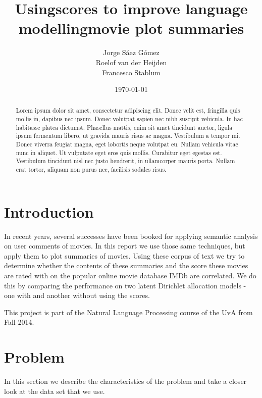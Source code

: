 \documentclass[a4paper,10pt]{article}
\title{Usingscores to improve language modellingmovie plot summaries}
\author{Jorge S\'{a}ez G\'{o}mez\\
Roelof van der Heijden\\
Francesco Stablum
}
\date{\today}
\begin{document}
\maketitle
\begin{abstract}
  Lorem ipsum dolor sit amet, consectetur adipiscing elit. Donec velit est, fringilla quis mollis in, dapibus nec ipsum. Donec volutpat sapien nec nibh suscipit vehicula. In hac habitasse platea dictumst. Phasellus mattis, enim sit amet tincidunt auctor, ligula ipsum fermentum libero, ut gravida mauris risus ac magna. Vestibulum a tempor mi. Donec viverra feugiat magna, eget lobortis neque volutpat eu. Nullam vehicula vitae nunc in aliquet. Ut vulputate eget eros quis mollis. Curabitur eget egestas est. Vestibulum tincidunt nisl nec justo hendrerit, in ullamcorper mauris porta. Nullam erat tortor, aliquam non purus nec, facilisis sodales risus.
\end{abstract}

\section{Introduction} 
In recent years, several successes have been booked for applying semantic analysis on user comments of movies.
In this report we use those same techniques, but apply them to plot summaries of movies.
Using these corpus of text we try to determine whether the contents of these summaries and the score these movies are rated with on the popular online movie database IMDb \cite{imdb} are correlated.
We do this by comparing the performance on two latent Dirichlet allocation models - one with and another without using the scores.

This project is part of the Natural Language Processing course of the UvA from Fall 2014.

\section{Problem}
In this section we describe the characteristics of the problem and take a closer look at the data set that we use.

\end{document}
